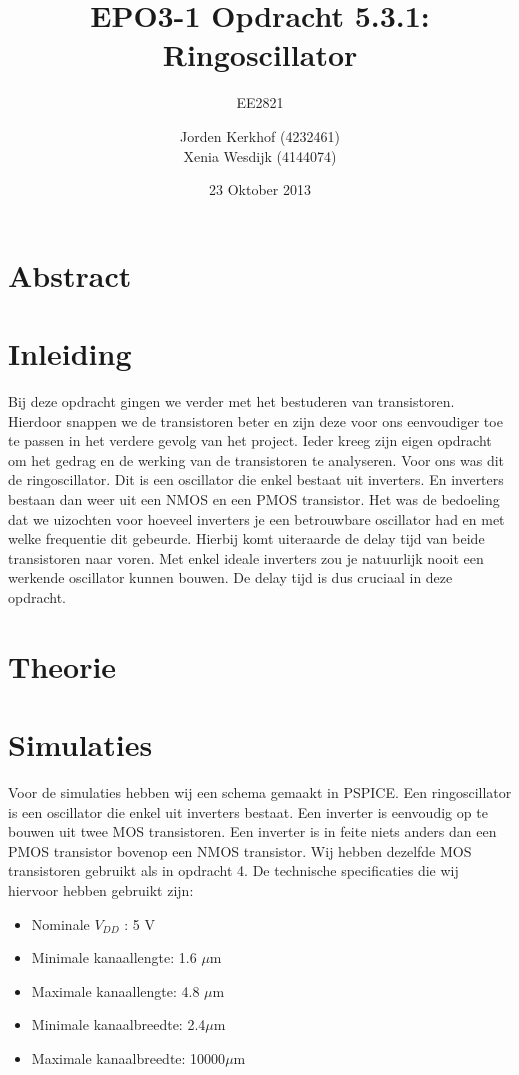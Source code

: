 \documentclass{scrartcl}  %
\author{Jorden {Kerkhof} (4232461)  \\{Xenia Wesdijk} (4144074)}
\title{EPO3-1   Opdracht 5.3.1: Ringoscillator}
\subtitle{EE2821}
\date{23 Oktober 2013}
\begin{document}
\maketitle
\vspace{80 mm}
\section*{Abstract}

\newpage
\setlength{\cftbeforetoctitleskip}{-3em}
\tableofcontents
\newpage
{}
\section{Inleiding}
Bij deze opdracht gingen we verder met het bestuderen van transistoren. Hierdoor snappen we de transistoren beter en zijn deze voor ons eenvoudiger toe te passen in het verdere gevolg van het project. Ieder kreeg zijn eigen opdracht om het gedrag en de werking van de transistoren te analyseren. Voor ons was dit de ringoscillator. Dit is een oscillator die enkel bestaat uit inverters. En inverters bestaan dan weer uit een NMOS en een PMOS transistor. Het was de bedoeling dat we uizochten voor hoeveel inverters je een betrouwbare oscillator had en met welke frequentie dit gebeurde. Hierbij komt uiteraarde de delay tijd van beide transistoren naar voren. Met enkel ideale inverters zou je natuurlijk nooit een werkende oscillator kunnen bouwen. De delay tijd is dus cruciaal in deze opdracht.  

\section{Theorie}

\section{Simulaties}
Voor de simulaties hebben wij een schema gemaakt in PSPICE. Een ringoscillator is een oscillator die enkel uit inverters bestaat. Een inverter is eenvoudig op te bouwen uit twee MOS transistoren. Een inverter is in feite niets anders dan een PMOS transistor bovenop een NMOS transistor. Wij hebben dezelfde MOS transistoren gebruikt als in opdracht 4. De technische specificaties die wij hiervoor hebben gebruikt zijn:
\begin{itemize}
	\item Nominale $V_{DD}$ : 5 V
	\item Minimale kanaallengte: 1.6 $\mu$m
	\item Maximale kanaallengte: 4.8 $\mu$m
	\item Minimale kanaalbreedte: 2.4$\mu$m
	\item Maximale kanaalbreedte: 10000$\mu$m
\end{itemize}
\end{document}
